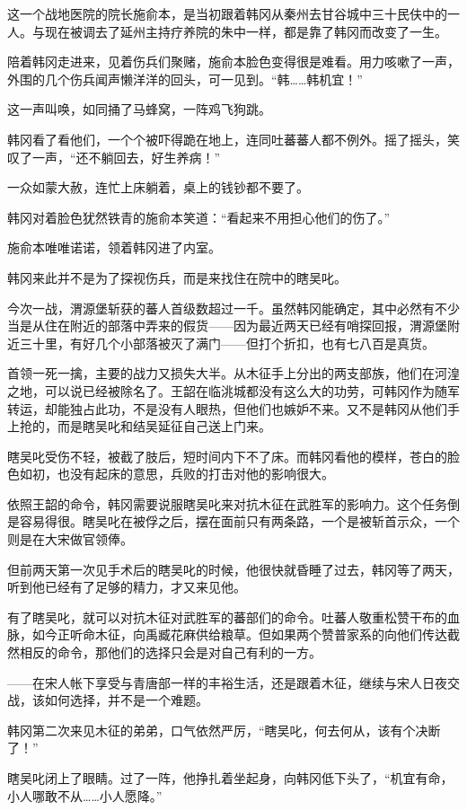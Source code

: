 这一个战地医院的院长施俞本，是当初跟着韩冈从秦州去甘谷城中三十民伕中的一人。与现在被调去了延州主持疗养院的朱中一样，都是靠了韩冈而改变了一生。

陪着韩冈走进来，见着伤兵们聚赌，施俞本脸色变得很是难看。用力咳嗽了一声，外围的几个伤兵闻声懒洋洋的回头，可一见到。“韩……韩机宜！”

这一声叫唤，如同捅了马蜂窝，一阵鸡飞狗跳。

韩冈看了看他们，一个个被吓得跪在地上，连同吐蕃蕃人都不例外。摇了摇头，笑叹了一声，“还不躺回去，好生养病！”

一众如蒙大赦，连忙上床躺着，桌上的钱钞都不要了。

韩冈对着脸色犹然铁青的施俞本笑道：“看起来不用担心他们的伤了。”

施俞本唯唯诺诺，领着韩冈进了内室。

韩冈来此并不是为了探视伤兵，而是来找住在院中的瞎吴叱。

今次一战，渭源堡斩获的蕃人首级数超过一千。虽然韩冈能确定，其中必然有不少当是从住在附近的部落中弄来的假货——因为最近两天已经有哨探回报，渭源堡附近三十里，有好几个小部落被灭了满门——但打个折扣，也有七八百是真货。

首领一死一擒，主要的战力又损失大半。从木征手上分出的两支部族，他们在河湟之地，可以说已经被除名了。王韶在临洮城都没有这么大的功劳，可韩冈作为随军转运，却能独占此功，不是没有人眼热，但他们也嫉妒不来。又不是韩冈从他们手上抢的，而是瞎吴叱和结吴延征自己送上门来。

瞎吴叱受伤不轻，被截了肢后，短时间内下不了床。而韩冈看他的模样，苍白的脸色如初，也没有起床的意思，兵败的打击对他的影响很大。

依照王韶的命令，韩冈需要说服瞎吴叱来对抗木征在武胜军的影响力。这个任务倒是容易得很。瞎吴叱在被俘之后，摆在面前只有两条路，一个是被斩首示众，一个则是在大宋做官领俸。

但前两天第一次见手术后的瞎吴叱的时候，他很快就昏睡了过去，韩冈等了两天，听到他已经有了足够的精力，才又来见他。

有了瞎吴叱，就可以对抗木征对武胜军的蕃部们的命令。吐蕃人敬重松赞干布的血脉，如今正听命木征，向禹臧花麻供给粮草。但如果两个赞普家系的向他们传达截然相反的命令，那他们的选择只会是对自己有利的一方。

——在宋人帐下享受与青唐部一样的丰裕生活，还是跟着木征，继续与宋人日夜交战，该如何选择，并不是一个难题。

韩冈第二次来见木征的弟弟，口气依然严厉，“瞎吴叱，何去何从，该有个决断了！”

瞎吴叱闭上了眼睛。过了一阵，他挣扎着坐起身，向韩冈低下头了，“机宜有命，小人哪敢不从……小人愿降。”

